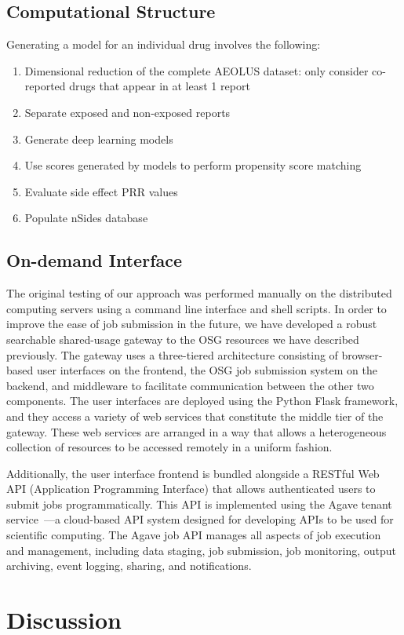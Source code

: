 \documentclass{ws-procs11x85}
\begin{document}
\subsection{Computational Structure}
Generating a model for an individual drug involves the following:

\begin{enumerate}
\item Dimensional reduction of the complete AEOLUS dataset: only consider co-reported drugs that appear in at least 1 report
\item Separate exposed and non-exposed reports
\item Generate deep learning models
\item Use scores generated by models to perform propensity score matching
\item Evaluate side effect PRR values
\item Populate nSides database
\end{enumerate}


\subsection{On-demand Interface}
The original testing of our approach was performed manually on the distributed computing servers using a command line interface and shell scripts. In order to improve the ease of job submission in the future, we have developed a robust searchable shared-usage gateway to the OSG resources we have described previously. The gateway uses a three-tiered architecture consisting of browser-based user interfaces on the frontend, the OSG job submission system on the backend, and middleware to facilitate communication between the other two components. The user interfaces are deployed using the Python Flask framework, and they access a variety of web services that constitute the middle tier of the gateway. These web services are arranged in a way that allows a heterogeneous collection of resources to be accessed remotely in a uniform fashion.

Additionally, the user interface frontend is bundled alongside a RESTful Web API (Application Programming Interface) that allows authenticated users to submit jobs programmatically. This API is implemented using the Agave tenant service~\cite{dooley2012agave}---a cloud-based API system designed for developing APIs to be used for scientific computing. The Agave job API manages all aspects of job execution and management, including data staging, job submission, job monitoring, output archiving, event logging, sharing, and notifications.

\section{Discussion}




\end{document}
